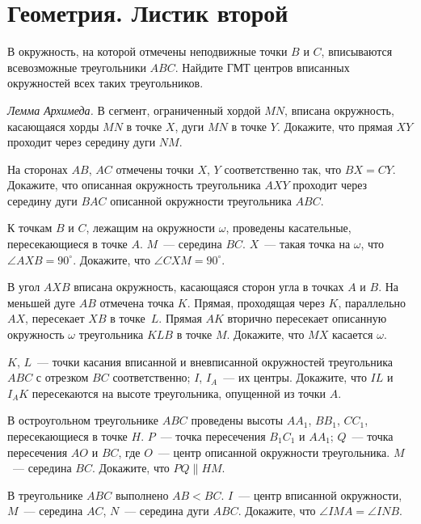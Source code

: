 

\section*{Геометрия. Листик второй}


\begin{problems}

\item
В окружность, на которой отмечены неподвижные точки $B$ и $C$, вписываются
всевозможные треугольники $ABC$.
Найдите ГМТ центров вписанных окружностей всех таких треугольников.

\item\emph{Лемма Архимеда.}
В сегмент, ограниченный хордой $MN$, вписана окружность, касающаяся хорды $MN$
в точке $X$, дуги $MN$ в точке $Y$.
Докажите, что прямая $XY$ проходит через середину дуги $NM$.

\item
На сторонах $AB$, $AC$ отмечены точки $X$, $Y$ соответственно так, что
$BX = CY$.
Докажите, что описанная окружность треугольника $AXY$ проходит через середину
дуги $BAC$ описанной окружности треугольника $ABC$.

\item
К точкам $B$ и $C$, лежащим на окружности $\omega$, проведены касательные,
пересекающиеся в точке $A$.
$M$~--- середина $BC$.
$X$~--- такая точка на $\omega$, что $\angle AXB = 90^{\circ}$.
Докажите, что $\angle CXM = 90^{\circ}$.

\item
В угол $AXB$ вписана окружность, касающаяся сторон угла в точках $A$ и $B$.
На меньшей дуге $AB$ отмечена точка $K$.
Прямая, проходящая через $K$, параллельно $AX$, пересекает $XB$ в точке~$L$.
Прямая $AK$ вторично пересекает описанную окружность $\omega$ треугольника
$KLB$ в точке $M$.
Докажите, что $MX$ касается $\omega$.

\item
$K$, $L$~--- точки касания вписанной и вневписанной окружностей треугольника
$ABC$ с отрезком $BC$ соответственно; $I$, $I_A$~--- их центры.
Докажите, что $IL$ и $I_AK$ пересекаются на высоте треугольника, опущенной из
точки $A$.

\item
В остроугольном треугольнике $ABC$ проведены высоты $A A_1$, $B B_1$, $C C_1$,
пересекающиеся в точке $H$.
$P$~--- точка пересечения $B_1 C_1$ и $A A_1$; $Q$~--- точка пересечения $AO$ и
$BC$, где $O$~--- центр описанной окружности треугольника.
$M$~--- середина $BC$.
Докажите, что $PQ \parallel HM$.

\item
В треугольнике $ABC$ выполнено $AB < BC$.
$I$~--- центр вписанной окружности, $M$~--- середина $AC$, $N$~--- середина
дуги $ABC$.
Докажите, что $\angle IMA = \angle INB$.

\end{problems}

